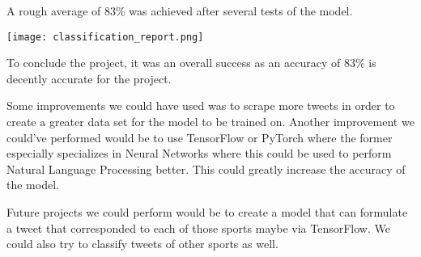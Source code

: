 \documentclass{article}
\begin{document}
    A rough average of 83\% was achieved after several tests of the model. 
    

    \texttt{[image: classification\_report.png]}

    To conclude the project, it was an overall success as an accuracy of 83\% is decently accurate for the project.

    Some improvements we could have used was to scrape more tweets in order to create a greater data set for the model to be trained on. Another improvement we could've performed would be to use TensorFlow or PyTorch where the former especially specializes in Neural Networks where this could be used to perform Natural Language Processing better. This could greatly increase the accuracy of the model.

    Future projects we could perform would be to create a model that can formulate a tweet that corresponded to each of those sports maybe via TensorFlow. We could also try to classify tweets of other sports as well. 
\end{document}
